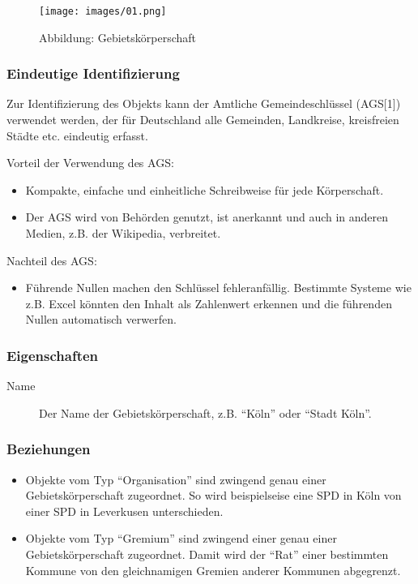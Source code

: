 \begin{figure}[htbp]
\centering
\texttt{[image: images/01.png]}
\caption{Abbildung: Gebietskörperschaft}
\end{figure}

\subsubsection{Eindeutige Identifizierung}

Zur Identifizierung des Objekts kann der Amtliche Gemeindeschlüssel
(AGS{[}1{]}) verwendet werden, der für Deutschland alle Gemeinden,
Landkreise, kreisfreien Städte etc. eindeutig erfasst.

Vorteil der Verwendung des AGS:

\begin{itemize}
\item
  Kompakte, einfache und einheitliche Schreibweise für jede
  Körperschaft.
\item
  Der AGS wird von Behörden genutzt, ist anerkannt und auch in anderen
  Medien, z.B. der Wikipedia, verbreitet.
\end{itemize}

Nachteil des AGS:

\begin{itemize}
\item
  Führende Nullen machen den Schlüssel fehleranfällig. Bestimmte Systeme
  wie z.B. Excel könnten den Inhalt als Zahlenwert erkennen und die
  führenden Nullen automatisch verwerfen.
\end{itemize}

\subsubsection{Eigenschaften}

\begin{description}
\item[Name]
Der Name der Gebietskörperschaft, z.B. ``Köln'' oder ``Stadt Köln''.
\end{description}

\subsubsection{Beziehungen}

\begin{itemize}
\item
  Objekte vom Typ ``Organisation'' sind zwingend genau einer
  Gebietskörperschaft zugeordnet. So wird beispielseise eine SPD in Köln
  von einer SPD in Leverkusen unterschieden.
\item
  Objekte vom Typ ``Gremium'' sind zwingend einer genau einer
  Gebietskörperschaft zugeordnet. Damit wird der ``Rat'' einer
  bestimmten Kommune von den gleichnamigen Gremien anderer Kommunen
  abgegrenzt.
\end{itemize}

